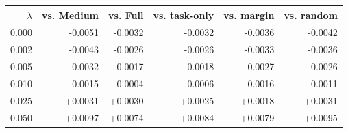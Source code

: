 \begin{tabular}{rrrrrr}
\toprule
$\lambda$ & vs. Medium & vs. Full & vs. task-only & vs. margin & vs. random \\
\midrule
0.000 & -0.0051 & -0.0032 & -0.0032 & -0.0036 & -0.0042 \\
0.002 & -0.0043 & -0.0026 & -0.0026 & -0.0033 & -0.0036 \\
0.005 & -0.0032 & -0.0017 & -0.0018 & -0.0027 & -0.0026 \\
0.010 & -0.0015 & -0.0004 & -0.0006 & -0.0016 & -0.0011 \\
0.025 & +0.0031 & +0.0030 & +0.0025 & +0.0018 & +0.0031 \\
0.050 & +0.0097 & +0.0074 & +0.0084 & +0.0079 & +0.0095 \\
\bottomrule
\end{tabular}
